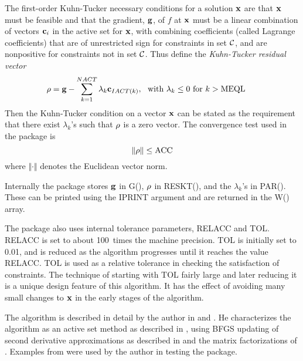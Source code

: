 \documentclass[twoside]{MATH77}
\begin{document}
The first-order Kuhn-Tucker necessary conditions for a solution ${\bf x}$ are
that ${\bf x}$ must be feasible and that the gradient, ${\bf g}$, of $f$ at ${\bf x}$
must be a linear combination of vectors ${\bf c}_i$ in the active set for ${\bf x}$,
with combining coefficients (called Lagrange coefficients) that are of
unrestricted sign for constraints in set {${\cal C}$}, and are nonpositive
for constraints not in set {${\cal C}$}. Thus define the {\em Kuhn-Tucker
residual vector}
\begin{equation}
\hspace{-15pt}\label{O3}{\bf \rho} ={\bf g}-\sum_{k=1}^{NACT}\lambda _k
{\bf c}_{IACT(k)},\ \ \text{with }\lambda _k\leq 0\text{ for } k>\text{MEQL}
\end{equation}
Then the Kuhn-Tucker condition on a vector ${\bf x}$ can be stated as the
requirement that there exist $\lambda _k$'s such that ${\bf \rho }$ is a
zero vector. The convergence test used in the package is
\begin{equation}
\label{O4}\Vert {\bf \rho} \Vert \leq \text{ACC}
\end{equation}
where $\Vert \cdot \Vert $ denotes the Euclidean vector norm.

Internally the package stores ${\bf g}$ in G(), ${\bf \rho }$ in RESKT(), and
the $\lambda_k$'s in PAR(). These can be printed using the IPRINT argument
and are returned in the W() array.

The package also uses internal tolerance parameters, RELACC and TOL. RELACC
is set to about 100~times the machine precision. TOL is initially set to
0.01, and is reduced as the algorithm progresses until it reaches the value
RELACC. TOL is used as a relative tolerance in checking the satisfaction of
constraints. The technique of starting with TOL fairly large and later
reducing it is a unique design feature of this algorithm. It has the effect
of avoiding many small changes to ${\bf x}$ in the early stages of the
algorithm.

The algorithm is described in detail by the author in
\cite{Powell:1989:TOL} and \cite{Powell:ATA:1988}.  He characterizes the
algorithm as an active set method as described in \cite{Gill:1987:PO},
using BFGS updating of second derivative approximations as described in
\cite{Powell:UCD:1987} and the matrix factorizations of
\cite{Goldfarb:1983:ANS}.  Examples from \cite{Hock:1981:TEN} were used by
the author in testing the package.



\end{document}
